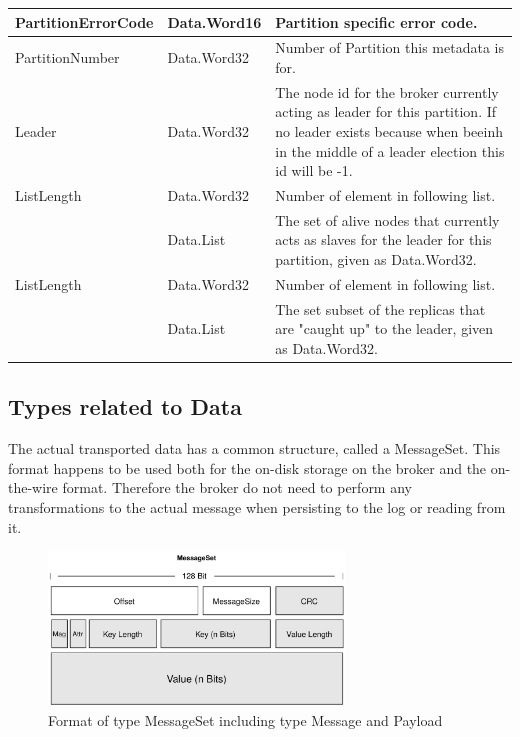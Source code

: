 \begin{table}[H]
\centering
\begin{tabular}{ l  l  p{10cm} }
\hline
PartitionErrorCode  & Data.Word16 & Partition specific error code.                                                          \\ \hline
PartitionNumber     & Data.Word32 & Number of Partition this metadata is for.                                               \\ \hline
Leader              & Data.Word32 & The node id for the broker currently acting as leader for this partition.
                       If no leader exists because when beeinh in the middle of
                       a leader election this id will be -1.                                                                \\ \hline
ListLength        & Data.Word32     & Number of element in following list.                                                  \\ \hline
[Replicas]         & Data.List & The set of alive nodes that currently acts as
                       slaves for the leader for this partition, given as
                       Data.Word32.                                                                                        \\ \hline
ListLength        & Data.Word32     & Number of element in following list.                                                  \\ \hline
[Isr]   & Data.List   & The set subset of the replicas that are "caught up" to
                       the leader, given as Data.Word32.        \\ \hline
\end{tabular}
\end{table}


\subsection{Types related to Data}
\label{impl-protocol-types-data}
The actual transported data has a common structure,
called a MessageSet. This format happens to be used both for the on-disk storage on the
broker and the on-the-wire format. Therefore the broker do not need to perform
any transformations to the actual message when persisting to the log or reading
from it. 

\begin{figure}[H]
    \centering
    \includegraphics[width=0.7\textwidth]{images/impl-prot-types-messageSet.png}
    \caption{Format of type MessageSet including type Message and Payload}
    \label{fig:impl-prot-types-messageSet}
\end{figure}

